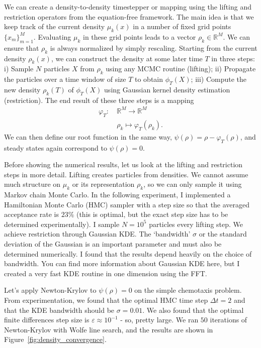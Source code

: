 \documentclass{article}
\begin{document}
We can create a density-to-density timestepper or mapping using the lifting and restriction operators from the equation-free framework. The main idea is that we keep track of the current density $\mu_k(x)$ in a number of fixed grid points $\{x_m\}_{m=1}^M$. Evaluating $\mu_k$ in these grid points leads to a vector $\rho_k \in \mathbb{R}^M$. We can ensure that $\rho_k$ is always normalized by simply rescaling.  Starting from the current density $\rho_k(x)$, we can construct the density at some later time $T$ in three steps: i) Sample $N$ particles $X$ from $\rho_k$ using any MCMC routine (lifting); ii) Propagate the particles over a time window of size $T$ to obtain $\phi_T(X)$; iii) Compute the new density $\rho_{k}(T)$ of $\phi_T(X)$ using Gaussian kernel density estimation (restriction). The end result of these three steps is a mapping
\begin{align} \label{eq:density_timestepper}
    \varphi_T: \ &\mathbb{R}^M \to \mathbb{R}^M \\
    &\rho_k \mapsto \varphi_T(\rho_k).
\end{align}
We can then define our root function in the same way, $\psi(\rho) = \rho - \varphi_T(\rho)$, and steady states again correspond to $\psi(\rho) = 0$.

Before showing the numerical results, let us look at the lifting and restriction steps in more detail. Lifting creates particles from densities. We cannot assume much structure on $\mu_k$ or its representation $\rho_k$, so we can only sample it using Markov chain Monte Carlo. In the following experiment, I implemented a Hamiltonian Monte Carlo (HMC) sampler with a step size so that the averaged acceptance rate is $23\%$ (this is optimal, but the exact step size has to be determined experimentally). I sample $N=10^5$ particles every lifting step. We achieve restriction through Gaussian KDE. The `bandwidth' $\sigma$ or the standard deviation of the Gaussian is an important parameter and must also be determined numerically. I found that the results depend heavily on the choice of bandwidth. You can find more information about Gaussian KDE here, but I created a very fast KDE routine in one dimension using the FFT. 

Let's apply Newton-Krylov to $\psi(\rho) = 0$ on the simple chemotaxis problem. From experimentation, we found that the optimal HMC time step $\Delta t=2$ and that the KDE bandwidth should be $\sigma = 0.01$. We also found that the optimal finite differences step size is $\varepsilon \approx 10^{-1}$ - so, pretty large. We ran $50$ iterations of Newton-Krylov with Wolfe line search, and the results are shown in Figure~\ref{fig:density_convergence}. 
\end{document}
